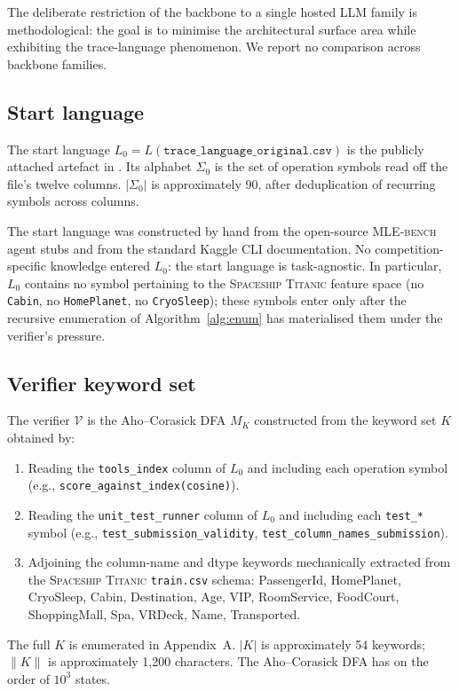 The deliberate restriction of the backbone to a single hosted LLM
family is methodological: the goal is to minimise the
architectural surface area while exhibiting the trace-language
phenomenon.  We report no comparison across backbone families.

\subsection{Start language}

The start language $L_0 = L(\texttt{trace\_language\_original.csv})$
is the publicly attached artefact in
.  Its alphabet
$\Sigma_0$ is the set of operation symbols read off the file's
twelve columns.  $|\Sigma_0|$ is approximately 90, after
deduplication of recurring symbols across columns.

The start language was constructed by hand from the open-source
\textsc{MLE-bench} agent stubs and from the standard Kaggle CLI
documentation.  No competition-specific knowledge entered
$L_0$: the start language is task-agnostic.  In particular,
$L_0$ contains no symbol pertaining to the \textsc{Spaceship
Titanic} feature space (no \texttt{Cabin}, no \texttt{HomePlanet},
no \texttt{CryoSleep}); these symbols enter only after the
recursive enumeration of Algorithm~\ref{alg:enum} has materialised
them under the verifier's pressure.

\subsection{Verifier keyword set}

The verifier $\mathcal{V}$ is the Aho--Corasick DFA $M_K$
constructed from the keyword set $K$ obtained by:
\begin{enumerate}
\item Reading the \texttt{tools\_index} column of $L_0$ and
including each operation symbol (e.g.,
\texttt{score\_against\_index(cosine)}).
\item Reading the \texttt{unit\_test\_runner} column of $L_0$
and including each \texttt{test\_*} symbol (e.g.,
\texttt{test\_submission\_validity},
\texttt{test\_column\_names\_submission}).
\item Adjoining the column-name and dtype keywords mechanically
extracted from the
\textsc{Spaceship Titanic} \texttt{train.csv} schema:
\textsf{PassengerId}, \textsf{HomePlanet}, \textsf{CryoSleep},
\textsf{Cabin}, \textsf{Destination}, \textsf{Age},
\textsf{VIP}, \textsf{RoomService}, \textsf{FoodCourt},
\textsf{ShoppingMall}, \textsf{Spa}, \textsf{VRDeck},
\textsf{Name}, \textsf{Transported}.
\end{enumerate}
The full $K$ is enumerated in Appendix~A.  $|K|$ is approximately
54 keywords; $\|K\|$ is approximately 1,200 characters.  The
Aho--Corasick DFA has on the order of $10^3$ states.

